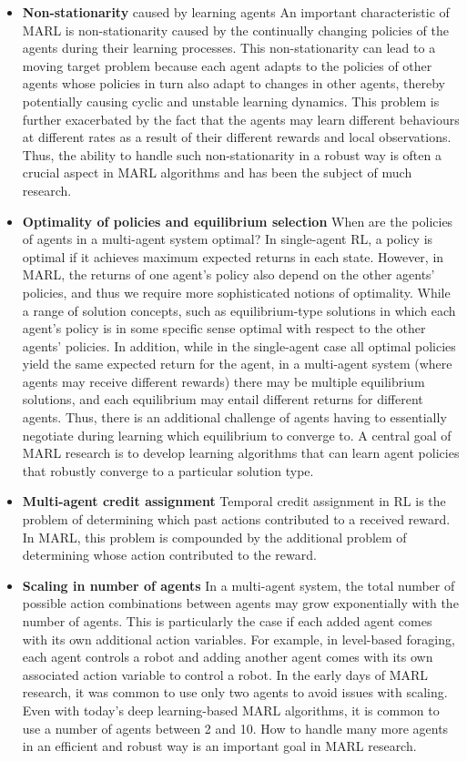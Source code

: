 \documentclass{article}
\begin{document}
\begin{itemize}
	\item \textbf{Non-stationarity} caused by learning agents An important characteristic of MARL is non-stationarity caused by the continually changing policies of the agents during their learning processes. This non-stationarity can lead to a moving target problem because each agent adapts to the policies of other agents whose policies in turn also adapt to changes in other agents, thereby potentially causing cyclic and unstable learning dynamics. This problem is further exacerbated by the fact that the agents may learn different behaviours at different rates as a result of their different rewards and local observations. Thus, the ability to handle such non-stationarity in a robust way is often a crucial aspect in MARL algorithms and has been the subject of much research.  
	\item \textbf{Optimality of policies and equilibrium selection} When are the policies of agents in a multi-agent system optimal? In single-agent RL, a policy is optimal if it achieves maximum expected returns in each state. However, in MARL, the returns of one agent’s policy also depend on the other agents’ policies, and thus we require more sophisticated notions of optimality. While a range of solution concepts, such as equilibrium-type solutions in which each agent’s policy is in some specific sense optimal with respect to the other agents’ policies. In addition, while in the single-agent case all optimal policies yield the same expected return for the agent, in a multi-agent system (where agents may receive different rewards) there may be multiple equilibrium solutions, and each equilibrium may entail different returns for different agents. Thus, there is an additional challenge of agents having to essentially negotiate during learning which equilibrium to converge to. A central goal of MARL research is to develop learning algorithms that can learn agent policies that robustly converge to a particular solution type.
	\item \textbf{Multi-agent credit assignment} Temporal credit assignment in RL is the problem of determining which past actions contributed to a received reward. In MARL, this problem is compounded by the additional problem of determining whose action contributed to the reward. 
	\item \textbf{Scaling in number of agents} In a multi-agent system, the total number of possible action combinations between agents may grow exponentially with the number of agents. This is particularly the case if each added agent comes with its own additional action variables. For example, in level-based foraging, each agent controls a robot and adding another agent comes with its own associated action variable to control a robot. In the early days of MARL research, it was common to use only two agents to avoid issues with scaling. Even with today’s deep learning-based MARL algorithms, it is common to use a number of agents between 2 and 10. How to handle many more agents in an efficient and robust way is an important goal in MARL research.
\end{itemize}
\end{document}
